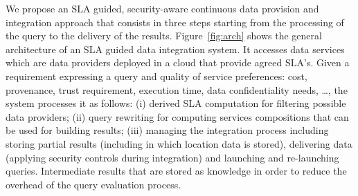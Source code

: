We propose an SLA guided, security-aware continuous data provision and integration approach that consists in three steps  starting from the processing of the query  to the delivery of the results.
Figure~\ref{fig:arch} shows the general architecture of an SLA guided data integration system. It accesses data services which are data providers deployed in a cloud  that provide agreed SLA's. 
Given a requirement expressing a query and quality of service preferences: cost, provenance, trust requirement, execution time, data confidentiality needs, \dots, the system processes it  as follows: (i) derived SLA  computation for filtering possible data providers; (ii) query rewriting for computing services compositions that can be used for building results; (iii) managing the integration process including storing partial results (including in  which location data is stored), delivering data (applying security controls during integration) and launching and re-launching queries. Intermediate results that are stored as knowledge in order to reduce the overhead of the query evaluation process. 


\begin{figure}
\end{figure}

